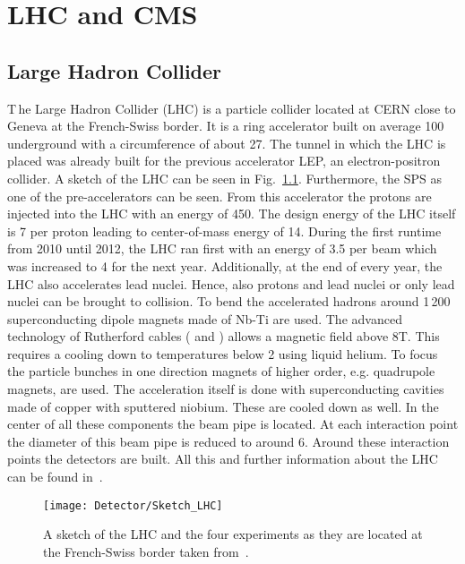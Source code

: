 \chapter{LHC and CMS \label{sec:LHCCMS}}

\section{Large Hadron Collider \label{LHCCMSLHC}}

\lettrine[lines=2]{T}{\,}he Large Hadron Collider (LHC) is a particle collider located at CERN close to Geneva at the French-Swiss border. It is a ring accelerator built on average 100\m{} underground with a circumference of about 27\km{}. The tunnel in which the LHC is placed was already built for the previous accelerator LEP, an electron-positron collider. A sketch of the LHC can be seen in Fig.~\ref{plot:LCHSketch}. Furthermore, the SPS as one of the pre-accelerators can be seen. From this accelerator the protons are injected into the LHC with an energy of 450\GeV{}. The design energy of the LHC itself is 7\TeV{} per proton leading to center-of-mass energy of 14\TeV{}. During the first runtime from 2010 until 2012, the LHC ran first with an energy of 3.5\TeV{} per beam which was increased to 4\TeV{} for the next year. Additionally, at the end of every year, the LHC also accelerates lead nuclei. Hence, also protons and lead nuclei or only lead nuclei can be brought to collision. To bend the accelerated hadrons around 1\,200 superconducting dipole magnets made of Nb-Ti are used. The advanced technology of Rutherford cables (\cite{RuthCables1} and \cite{RuthCables2}) allows a magnetic field above 8\unit{T}. This requires a cooling down to temperatures below 2\K{} using liquid helium. To focus the particle bunches in one direction magnets of higher order, e.g. quadrupole magnets, are used. The acceleration itself is done with superconducting cavities made of copper with sputtered niobium. These are cooled down as well. In the center of all these components the beam pipe is located. At each interaction point the diameter of this beam pipe is reduced to around 6\cm{}. Around these interaction points the detectors are built. All this and further information about the LHC can be found in~.

\begin{figure}[!ht]
  \centering
  \texttt{[image: Detector/Sketch\_LHC]}
  \caption[Sketch of the LHC]{A sketch of the LHC and the four experiments as they are located at the French-Swiss border taken from~\cite{Team:40525}. \label{plot:LCHSketch}}
\end{figure}

